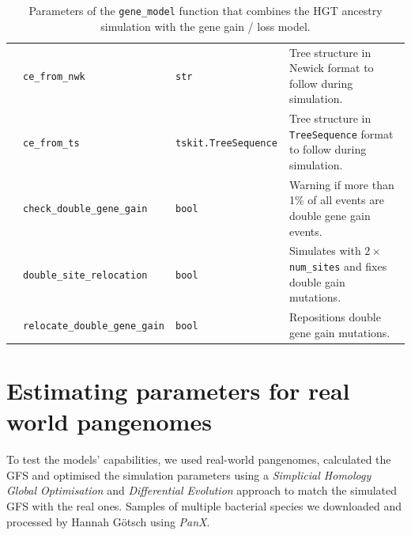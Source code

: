 \begin{table}[H]
\begin{adjustbox}{width=\textwidth}
\begin{tabular}{r|lll}
                     & \texttt{ce_from_nwk}               & \texttt{str}                 & Tree structure in Newick format to follow during simulation.                               \\
                     & \texttt{ce_from_ts}                & \texttt{tskit.TreeSequence } & Tree structure in \texttt{TreeSequence} format to follow during simulation.    \\
                     & \texttt{check_double_gene_gain}    & \texttt{bool}                & Warning if more than 1\% of all events are double gene gain events.                        \\
                     & \texttt{double_site_relocation}    & \texttt{bool}                & Simulates with $2 \times $ \texttt{num_sites} and fixes double gain mutations. \\
                     & \texttt{relocate_double_gene_gain} & \texttt{bool}                & Repositions double gene gain mutations.                                                    \\
        \end{tabular}
    \end{adjustbox}
    \caption{Parameters of the \texttt{gene_model} function that combines the HGT ancestry simulation with the gene gain / loss model.}
\end{table}

\section{Estimating parameters for real world pangenomes}
To test the models' capabilities, we used real-world pangenomes, calculated the \ac{GFS} and optimised the simulation parameters using a \textit{Simplicial Homology Global Optimisation} and \textit{Differential Evolution} approach to match the simulated \ac{GFS} with the real ones.
Samples of multiple bacterial species we downloaded and processed by Hannah G\"otsch using \textit{PanX}.

